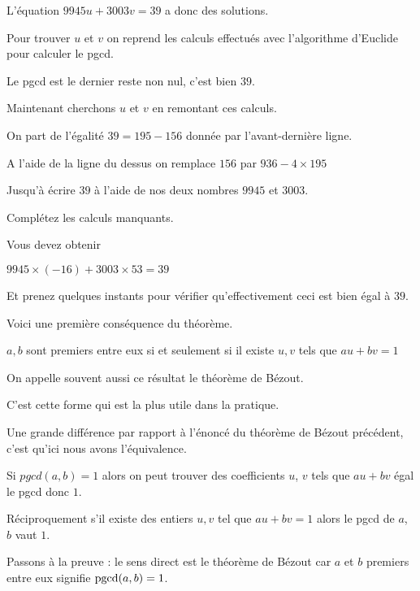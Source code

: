 L'équation $9945u+3003v=39$ a donc des solutions.

\change

Pour trouver $u$ et $v$ on reprend les calculs effectués avec l'algorithme d'Euclide
pour calculer le pgcd. 

Le pgcd est le dernier reste non nul, c'est bien $39$.


\change

Maintenant cherchons $u$ et $v$ en remontant ces calculs.

\change

On part de l'égalité $39   =  195- 156$ donnée par l'avant-dernière ligne.

\change

A l'aide de la ligne du dessus on remplace $156$ par $936 - 4\times 195$ 

\change 


Jusqu'à écrire $39$ à l'aide de nos deux nombres $9945$ et $3003$.

Complétez les calculs manquants.

\change

Vous devez obtenir 

$9945 \times (-16) +  3003\times 53 = 39$

Et prenez quelques instants pour vérifier qu'effectivement ceci
est bien égal à $39$.

\diapo

Voici une première conséquence du théorème.

$a,b$ sont premiers entre eux 
si et seulement si il existe $u,v$ tels que
$au+bv=1$

On appelle souvent aussi ce résultat le théorème de Bézout.

C'est cette forme qui est la plus utile dans la pratique.

Une grande différence par rapport à l'énoncé du théorème de Bézout précédent,
c'est qu'ici nous avons l'équivalence.

Si $pgcd(a,b)=1$ alors on peut trouver des coefficients $u$, $v$ tels que $au+bv$ égal le pgcd donc $1$.

Réciproquement s'il existe des entiers $u,v$ tel que $au+bv=1$ alors le pgcd de $a$, $b$ vaut $1$.


\change

Passons à la preuve : le sens direct est le théorème de Bézout car
$a$ et $b$ premiers entre eux signifie $\mathop{\mathrm{pgcd}}\nolimits(a,b)=1$.

\change

